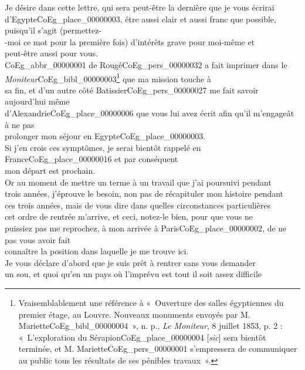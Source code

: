 \documentclass{book}
\begin{document}
Je désire dans cette lettre, qui sera peut-être la dernière que je vous écrirai\\
d’Egypte\gls{CoEg_place_00000003}, être aussi clair et aussi franc que possible, puisqu’il s’agit (permettez-\\
-moi ce mot pour la première fois) d’intérêts grave pour moi-même et\\
peut-être aussi pour vous.\\
\indent \gls{CoEg_abbr_00000001} de Rougé\gls{CoEg_pers_00000032} a fait imprimer dans le \textit{Moniteur}\gls{CoEg_bibl_00000003}\footnote{Vraisemblablement une référence à «~Ouverture des salles égyptiennes du premier étage, au Louvre. Nouveaux monuments envoyés par M. Mariette\gls{CoEg_bibl_00000004}~», n. p., \textit{Le Moniteur}, 8 juillet 1853, p. 2 : «~L'exploration du Sérapion\gls{CoEg_place_00000004} {[\textit{sic}]} sera bientôt terminée, et M. Mariette\gls{CoEg_pers_00000001} s'empressera de communiquer au public tous les résultats de ses pénibles travaux~».} que ma mission touche à\\
sa fin, et d’un autre côté Batissier\gls{CoEg_pers_00000027} me fait savoir aujourd’hui même\\
d’Alexandrie\gls{CoEg_place_00000006} que vous lui avez écrit afin qu’il m’engageât à ne pas\\
prolonger mon séjour en Egypte\gls{CoEg_place_00000003}.\\
\indent Si j’en crois ces symptômes, je serai bientôt rappelé en France\gls{CoEg_place_00000016} et par conséquent\\
mon départ est prochain.\\
\indent Or au moment de mettre un terme à un travail que j’ai poursuivi pendant\\
trois années, j’éprouve le besoin, non pas de récapituler mon histoire pendant\\
ces trois années, mais de vous dire dans quelles circonstances particulières\\
cet ordre de rentrée m’arrive, et ceci, notez-le bien, pour que vous ne\\
puissiez pas me reprochez, à mon arrivée à Paris\gls{CoEg_place_00000002}, de ne pas vous avoir fait\\
connaître la position dans laquelle je me trouve ici.\\
\indent Je vous déclare d’abord que je suis prêt à rentrer sans vous demander\\
un sou, et quoi qu’en un pays où l’imprévu est tout il soit assez difficile\\
\end{document}
